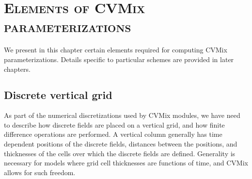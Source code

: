\chapter{\scshape Elements of CVMix parameterizations}
\label{chapter:cvmix_elements}

\minitoc
\vspace{.5cm}

\begin{mdframed}[backgroundcolor=lightgray!50]
We present in this chapter certain elements required for computing
CVMix parameterizations.  Details specific to particular schemes are
provided in later chapters.
\end{mdframed}




\section{Discrete vertical grid}
\label{section:vertical-grid-numerics}

As part of the numerical discretizations used by CVMix modules, we
have need to describe how discrete fields are placed on a vertical
grid, and how finite difference operations are performed.  A vertical
column generally has time dependent positions of the discrete fields,
distances between the positions, and thicknesses of the cells over
which the discrete fields are defined.  Generality is necessary for
models where grid cell thicknesses are functions of time, and CVMix
allows for such freedom.

